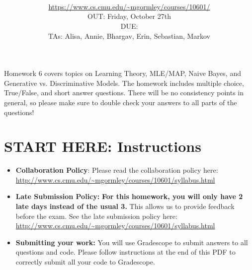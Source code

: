 \documentclass[11pt,addpoints,answers]{exam}
\title{\textsc{\hwName}
} %
\author{\courseName\\
\url{https://www.cs.cmu.edu/~mgormley/courses/10601/} \\
OUT: Friday, October 27th \\
DUE: \dueDate{} \\ 
TAs: Alisa, Annie, Bhargav, Erin, Sebastian, Markov
}
\date{}
\date{}
\begin{document}
\maketitle 

\begin{notebox}
Homework 6 covers topics on Learning Theory, MLE/MAP, Naive Bayes, and Generative vs. Discriminative Models. The homework includes multiple choice, True/False, and short answer questions. There will be no consistency points in general, so please make sure to double check your answers to all parts of the questions!
\end{notebox}
\newcommand \maxsubs {10 }
\section*{START HERE: Instructions}
\begin{itemize}

\item \textbf{Collaboration Policy}: Please read the collaboration policy here: \url{http://www.cs.cmu.edu/~mgormley/courses/10601/syllabus.html}

\item\textbf{Late Submission Policy:} \textbf{For this homework, you will only have 2 late days instead of the usual 3.} This allows us to provide feedback before the exam. See the late submission policy here: \url{http://www.cs.cmu.edu/~mgormley/courses/10601/syllabus.html}

\item\textbf{Submitting your work:} You will use Gradescope to submit
  answers to all questions and code. Please
  follow instructions at the end of this PDF to correctly submit all your code to Gradescope.

  \begin{itemize}
    

    

\end{itemize}
\end{itemize}
\end{document}

